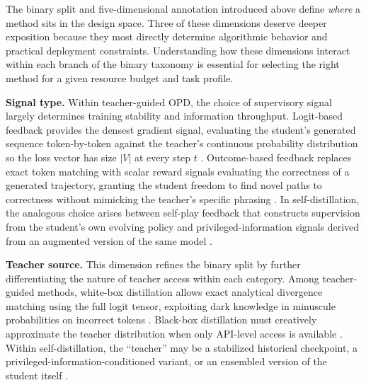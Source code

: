 \documentclass{article} %
\begin{document}
The binary split and five-dimensional annotation introduced above define \emph{where} a method sits in the design space. Three of these dimensions deserve deeper exposition because they most directly determine algorithmic behavior and practical deployment constraints. Understanding how these dimensions interact within each branch of the binary taxonomy is essential for selecting the right method for a given resource budget and task profile.

\textbf{Signal type.} Within teacher-guided OPD, the choice of supervisory signal largely determines training stability and information throughput. Logit-based feedback provides the densest gradient signal, evaluating the student's generated sequence token-by-token against the teacher's continuous probability distribution so the loss vector has size $|V|$ at every step $t$ \citep{2306.13649,2306.08543,2402.03898}. Outcome-based feedback replaces exact token matching with scalar reward signals evaluating the correctness of a generated trajectory, granting the student freedom to find novel paths to correctness without mimicking the teacher's specific phrasing \citep{2505.16142,2503.02832}. In self-distillation, the analogous choice arises between self-play feedback that constructs supervision from the student's own evolving policy \citep{2401.01335} and privileged-information signals derived from an augmented version of the same model \citep{2601.18734}.

\textbf{Teacher source.} This dimension refines the binary split by further differentiating the nature of teacher access within each category. Among teacher-guided methods, white-box distillation allows exact analytical divergence matching using the full logit tensor, exploiting dark knowledge in minuscule probabilities on incorrect tokens \citep{2306.13649,2402.03898}. Black-box distillation must creatively approximate the teacher distribution when only API-level access is available \citep{2511.10643,2305.12870}. Within self-distillation, the ``teacher'' may be a stabilized historical checkpoint, a privileged-information-conditioned variant, or an ensembled version of the student itself \citep{2401.01335,2601.18734,2602.20574}.
\end{document}
